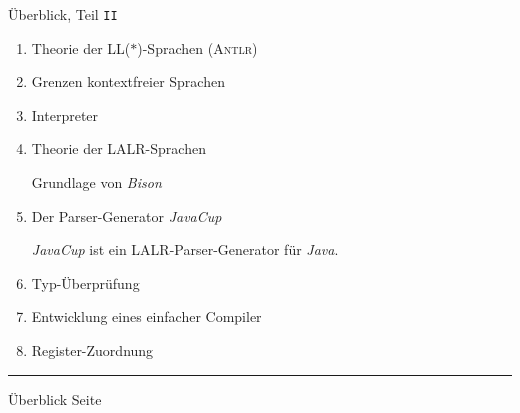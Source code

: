 \documentclass{slides}
\newcounter{mypage}
\begin{document}
\begin{slide}{}
\normalsize
\begin{center}
\"Uberblick, Teil \texttt{II}
\end{center}
\vspace{0.5cm}

\footnotesize
\begin{enumerate}
\item Theorie der LL($*$)-Sprachen (\textsc{Antlr})

\item Grenzen kontextfreier Sprachen

\item Interpreter

\item Theorie der LALR-Sprachen

      Grundlage von \textsl{Bison}
\item Der Parser-Generator \textsl{JavaCup}

      \textsl{JavaCup} ist ein LALR-Parser-Generator f\"ur \textsl{Java}.
\item Typ-\"Uberpr\"ufung
  
\item Entwicklung eines einfacher Compiler
\item Register-Zuordnung  
\end{enumerate}

\vspace*{\fill}
\tiny \addtocounter{mypage}{1}
\rule{17cm}{1mm}
\"Uberblick  \hspace*{\fill} Seite 
\end{slide}

\end{document}
